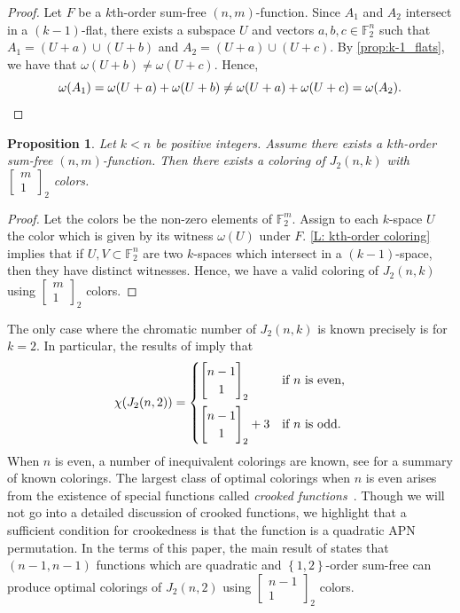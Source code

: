 \documentclass[12pt]{article}
\newtheorem{prop}[thm]{Proposition}
\theoremstyle{definition}
\newcommand{\Gauss}[2]{{\begin{bmatrix} #1 \\ #2 \end{bmatrix}_2}}
\newcommand{\F}{\mathbb F}
\newcommand{\set}[1]{\left\{#1\right\}}
\newcounter{numb}
\begin{document}
\begin{proof}
Let $F$ be a $k$th-order sum-free $(n, m)$-function.
Since $A_1$ and $A_2$ intersect in a $(k-1)$-flat, there exists a subspace $U$ and vectors $a, b, c \in \F_2^n$ such that $A_1 = (U+a)\cup(U+b)$ and $A_2 = (U+a)\cup (U+c)$. By \cref{prop:k-1_flats}, we have that $\omega(U+b) \neq \omega(U+c)$. Hence,
\begin{equation*}
    \omega(A_1) = \omega(U+a) + \omega(U + b)\neq \omega(U+a) + \omega(U+c) = \omega(A_2).
 \qedhere
\end{equation*}
\end{proof}


\begin{prop}\label{T: kth-order coloring}
    Let $k < n$ be positive integers. Assume there exists a $k$th-order sum-free $(n,m)$-function. Then there exists a coloring of $J_2(n,k)$ with $\Gauss{m}{1}$ colors.
\end{prop}

\begin{proof}
    Let the colors be the non-zero elements of $\F_2^m$. Assign to each $k$-space $U$ the color which is given by its witness $\omega(U)$ under $F$. \cref{L: kth-order coloring} implies that if $U, V \subset \F_2^n$ are two $k$-spaces which intersect in a $(k-1)$-space, then they have distinct witnesses. Hence, we have a valid coloring of $J_{2}(n, k)$ using $\Gauss{m}{1}$ colors.
\end{proof}


The only case where the chromatic number of $J_2(n, k)$ is known precisely is for $k = 2$. In particular, the results of \cite{Meszka2013, parallelisms_1973}  imply that 
\[
\chi(J_{2}(n, 2)) = 
\begin{cases}
    \Gauss{n-1}{1} &  \text{if $n$ is even,}\vspace{.5em}\\
    \Gauss{n-1}{1} + 3 &  \text{if $n$ is odd.}
\end{cases}
\]
When $n$ is even, a number of inequivalent colorings are known, see \cite{heering2025lineparallelismspgn2preparatalike} for a summary of known colorings. The largest class of optimal colorings when $n$ is even arises from the existence of special functions called \textit{crooked functions}~\cite{heering2025lineparallelismspgn2preparatalike}.
Though we will not go into a detailed discussion of crooked functions, we highlight that a sufficient condition for crookedness is that the function is a quadratic APN permutation. In the terms of this paper, the main result of \cite{heering2025lineparallelismspgn2preparatalike} states that $(n-1, n-1)$ functions which are quadratic and $\set{1,2}$-order sum-free can produce optimal colorings of $J_2(n, 2)$ using $\Gauss{n-1}{1}$ colors.
\end{document}
